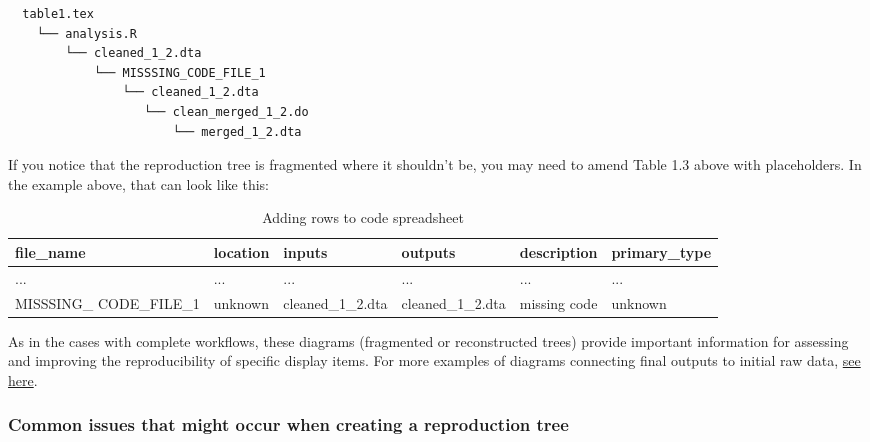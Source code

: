 \documentclass[
  openany]{book}
\begin{document}
\begin{verbatim}
  table1.tex
    └── analysis.R
        └── cleaned_1_2.dta
            └── MISSSING_CODE_FILE_1
                └── cleaned_1_2.dta
                   └── clean_merged_1_2.do
                       └── merged_1_2.dta
\end{verbatim}

If you notice that the reproduction tree is fragmented where it shouldn't be, you may need to amend Table 1.3 above with placeholders. In the example above, that can look like this:

\begin{table}[!h]

\caption{\label{tab:adding-rows}Adding rows to code spreadsheet}
\centering
\begin{tabu} to 
\hline
file\_name & location & inputs & outputs & description & primary\_type\\
\hline
... & ... & ... & ... & ... & ...\\
\hline
MISSSING\_
                                                CODE\_FILE\_1 & unknown & cleaned\_1\_2.dta & cleaned\_1\_2.dta & missing code & unknown\\
\hline
\end{tabu}
\end{table}

As in the cases with complete workflows, these diagrams (fragmented or reconstructed trees) provide important information for assessing and improving the reproducibility of specific display items. For more examples of diagrams connecting final outputs to initial raw data, \protect\hyperlink{examples-of-reproduction-trees}{see here}.

\hypertarget{common-issues-that-might-occur-when-creating-a-reproduction-tree}{%
\subsubsection{Common issues that might occur when creating a reproduction tree}\label{common-issues-that-might-occur-when-creating-a-reproduction-tree}}
\end{document}
